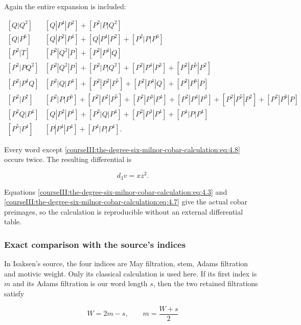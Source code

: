 Again the entire expansion is included:

\begin{equation}
\begin{array}{c|l}
[Q|Q^2]&[Q|P^4|P^2]+[P^2|P|Q^2]\\
{}[Q|P^6]&[Q|P^2|P^4]+[Q|P^4|P^2]+[P^2|P|P^6]\\
{}[P^2|T]&[P^2|Q^2|P]+[P^2|P^4|Q]\\
{}[P^2|PQ^2]&[P^2|Q^2|P]+[P^2|P|Q^2]+[P^2|P^4|P^3]+[P^2|P^5|P^2]\\
{}[P^2|P^4Q]&[P^2|Q|P^4]+[P^2|P^2|P^5]+[P^2|P^4|Q]+[P^2|P^6|P]\\
{}[P^2|P^7]&[P^2|P|P^6]+[P^2|P^2|P^5]+[P^2|P^3|P^4]
          +[P^2|P^4|P^3]+[P^2|P^5|P^2]+[P^2|P^6|P]\\
{}[P^2Q|P^4]&[Q|P^2|P^4]+[P^2|Q|P^4]+[P^2|P^3|P^4]+[P^4|P|P^4]\\
{}[P^5|P^4]&[P|P^4|P^4]+[P^4|P|P^4].
\end{array}
\label{courseIII:the-degree-six-milnor-cobar-calculation:eq:4.9}
\end{equation}

Every word except \eqref{courseIII:the-degree-six-milnor-cobar-calculation:eq:4.8} occurs twice. The resulting differential is

\begin{equation}
d_3v=xz^2.
 \label{courseIII:the-degree-six-milnor-cobar-calculation:eq:4.10}
\end{equation}

Equations \eqref{courseIII:the-degree-six-milnor-cobar-calculation:eq:4.3} and \eqref{courseIII:the-degree-six-milnor-cobar-calculation:eq:4.7} give the actual cobar preimages, so the calculation is reproducible without an external differential table.

\subsubsection{Exact comparison with the source's indices}

In Isaksen's source, the four indices are May filtration, stem, Adams filtration and motivic weight. Only its classical calculation is used here. If its first index is \(m\) and its Adams filtration is our word length \(s\), then the two retained filtrations satisfy

\begin{equation}
W=2m-s,\qquad m=\frac{W+s}{2}
 \label{courseIII:the-degree-six-milnor-cobar-calculation:eq:4.11}
\end{equation}

